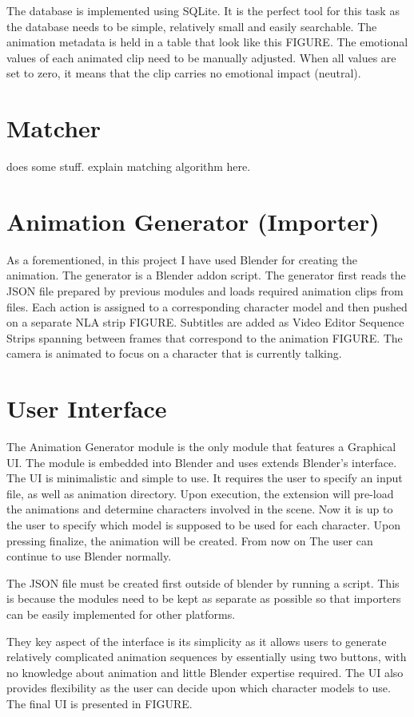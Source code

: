 The database is implemented using SQLite. It is the perfect tool for this task as the database needs to be simple, relatively small and easily searchable. The animation metadata is held in a table that look like this FIGURE. The emotional values of each animated clip need to be manually adjusted. When all values are set to zero, it means that the clip carries no emotional impact (neutral).



\section{Matcher}

does some stuff. explain matching algorithm here.


\section{Animation Generator (Importer)}


As a forementioned, in this project I have used Blender for creating the animation. The generator is a Blender addon script. The generator first reads the JSON file prepared by previous modules and loads required animation clips from files. Each action is assigned to a corresponding character model and then pushed on a separate NLA strip FIGURE. Subtitles are added as Video Editor Sequence Strips spanning between frames that correspond to the animation FIGURE. The camera is animated to focus on a character that is currently talking.


\section{User Interface}

The Animation Generator module is the only module that features a Graphical UI. The module is embedded into Blender and uses extends Blender's interface. The UI is minimalistic and simple to use. It requires the user to specify an input file, as well as animation directory. Upon execution, the extension will pre-load the animations and determine characters involved in the scene. Now it is up to the user to specify which model is supposed to be used for each character. Upon pressing finalize, the animation will be created. From now on The user can continue to use Blender normally.

The JSON file must be created first outside of blender by running a script. This is because the modules need to be kept as separate as possible so that importers can be easily implemented for other platforms.

They key aspect of the interface is its simplicity as it allows users to generate relatively complicated animation sequences by essentially using two buttons, with no knowledge about animation and little Blender expertise required. The UI also provides flexibility as the user can decide upon which character models to use. The final UI is presented in FIGURE.





